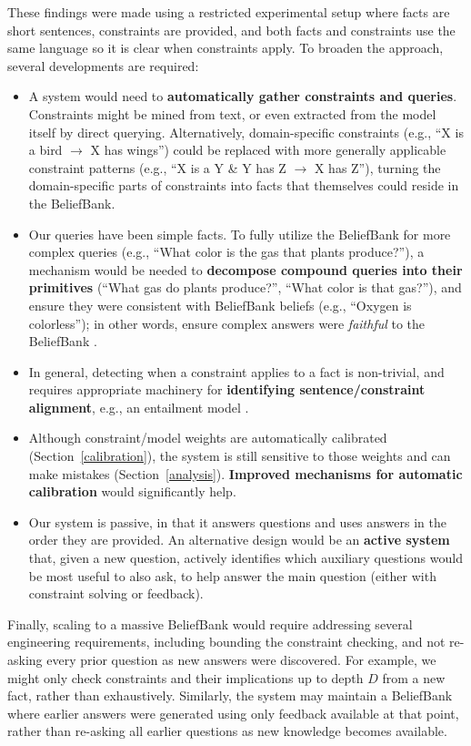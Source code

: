 \documentclass[11pt]{article}
\newenvironment{ite}{                     %
     \parskip 0cm \begin{itemize} \parskip 0cm \parsep 0cm \itemsep 0cm \topsep 0cm}{
        \end{itemize}} %
\begin{document}
These findings were made using a restricted experimental setup where facts are short sentences, constraints are provided, and both facts and constraints use the same language so it is clear when constraints apply. To broaden the approach, several developments are required:
\begin{ite}
\item
A system would need to {\bf automatically gather constraints and queries}.
Constraints might be mined from text, or even extracted from the model itself by direct querying. Alternatively, domain-specific constraints (e.g., ``X is a bird $\rightarrow$ X has wings'') could be replaced with more generally applicable constraint patterns
(e.g., ``X is a Y \& Y has Z $\rightarrow$ X has Z''), turning the domain-specific parts of constraints into facts that
themselves could reside in the BeliefBank.
\item Our queries have been simple facts. To fully utilize the BeliefBank for more complex
queries (e.g., ``What color is the gas that plants produce?''), a mechanism would be needed to {\bf decompose compound queries
into their primitives} (``What gas do plants produce?'', ``What color is that gas?''), and ensure they were
consistent with BeliefBank beliefs (e.g., ``Oxygen is colorless''); in other words, ensure complex answers were {\it faithful} 
to the BeliefBank \cite{Subramanian2020ObtainingFI}.
\item In general, detecting when a constraint applies to a fact is non-trivial, and requires appropriate machinery for
{\bf identifying sentence/constraint alignment}, e.g., an entailment model \cite{Seo2017BidirectionalAF}.
\item Although constraint/model weights are automatically calibrated (Section~\ref{calibration}), the
system is still sensitive to those weights and can make mistakes (Section~\ref{analysis}). {\bf Improved mechanisms for automatic calibration}
would significantly help.
\item Our system is passive, in that it answers questions and uses answers in the order they are provided. An alternative design
would be an {\bf active system} that, given a new question, actively identifies which auxiliary questions would be most
useful to also ask, to help answer the main question (either with constraint solving or feedback).
\end{ite}
Finally, scaling to a massive BeliefBank would require addressing several engineering requirements,
including bounding the constraint checking, and not re-asking every prior question as new answers were discovered.
For example, we might only check constraints
and their implications up to depth $D$ from a new fact, rather than exhaustively. Similarly, the system may 
maintain a BeliefBank where earlier answers were generated using only feedback available at that point, rather than re-asking
all earlier questions as new knowledge becomes available.
\end{document}
